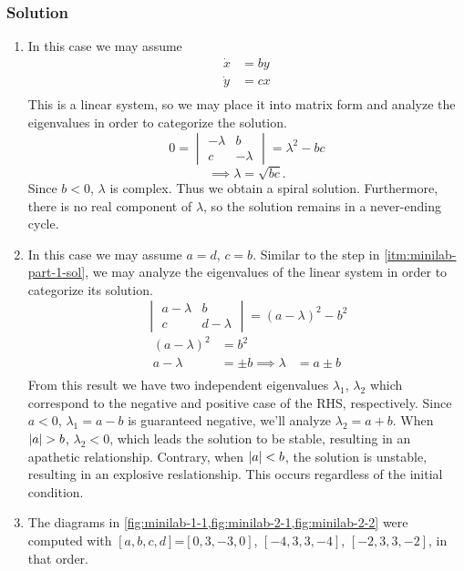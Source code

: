 \documentclass[12pt]{article}
\begin{document}
\subsubsection*{Solution}
\begin{enumerate}
\item
  \label{itm:minilab-part-1-sol}
  In this case we may assume
  \begin{equation*}
    \begin{aligned}
      \dot{x} &= by \\
      \dot{y} &= cx \\
    \end{aligned}
  \end{equation*}
  This is a linear system, so we may place it into matrix form and analyze the
  eigenvalues in order to categorize the solution.
  \begin{equation*}
    0=\begin{vmatrix} -\lambda & b \\ c & -\lambda \end{vmatrix} = \lambda^2-bc
  \end{equation*}
  \begin{equation*}
    \implies \lambda = \sqrt{bc}.
  \end{equation*}
  Since $b<0$, $\lambda$ is complex. Thus we obtain a spiral solution.
  Furthermore, there is no real component of $\lambda$, so the solution remains
  in a never-ending cycle.
\item In this case we may assume $a=d$, $c=b$. Similar to the step in
  \cref{itm:minilab-part-1-sol}, we may analyze the eigenvalues of the linear
  system in order to categorize its solution.
  \begin{equation*}
    \begin{vmatrix} a-\lambda & b \\ c & d-\lambda \end{vmatrix} = {(a-\lambda)}^2-b^2
  \end{equation*}
  \begin{equation*}
    \begin{aligned}
      {(a-\lambda)}^2 &= b^2 \\
      a-\lambda &= \pm b
      \implies \lambda &= a\pm b \\
    \end{aligned}
  \end{equation*}
  From this result we have two independent eigenvalues $\lambda_1$, $\lambda_2$
  which correspond to the negative and positive case of the RHS, respectively.
  Since $a<0$, $\lambda_1=a-b$ is guaranteed negative, we'll analyze
  $\lambda_2=a+b$. When $\abs{a}>b$, $\lambda_2<0$, which leads the solution to
  be stable, resulting in an apathetic relationship. Contrary, when $\left|{a}\right|<b$,
  the solution is unstable, resulting in an explosive reslationship. This occurs
  regardless of the initial condition.
\item The diagrams in \cref{fig:minilab-1-1,fig:minilab-2-1,fig:minilab-2-2}
  were computed with $[a, b, c, d]$=$[0, 3, -3, 0]$, $[-4, 3, 3, -4]$,
  $[-2, 3, 3, -2]$, in that order.

\end{enumerate}
\end{document}
